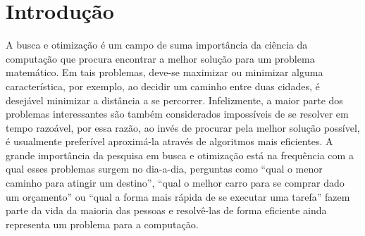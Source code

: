 \chapter[Introdução]{Introdução}

A busca e otimização é um campo de suma importância da ciência da computação que procura encontrar a melhor solução para um problema matemático. Em tais problemas, deve-se maximizar ou minimizar alguma característica, por exemplo, ao decidir um caminho entre duas cidades, é desejável minimizar a distância a se percorrer. Infelizmente, a maior parte dos problemas interessantes são também considerados impossíveis de se resolver em tempo razoável, por essa razão, ao invés de procurar pela melhor solução possível, é usualmente preferível aproximá-la através de algoritmos mais eficientes. A grande importância da pesquisa em busca e otimização está na frequência com a qual esses problemas surgem no dia-a-dia, perguntas como ``qual o menor caminho para atingir um destino'', ``qual o melhor carro para se comprar dado um orçamento'' ou ``qual a forma mais rápida de se executar uma tarefa'' fazem parte da vida da maioria das pessoas e resolvê-las de forma eficiente ainda representa um problema para a computação.

